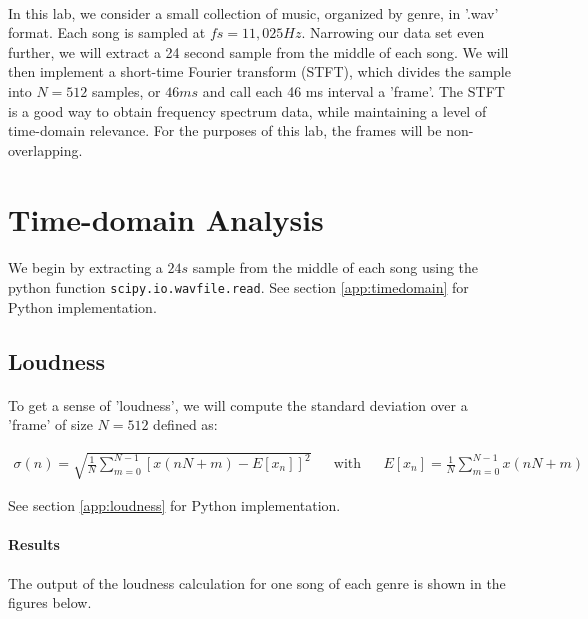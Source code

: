 \documentclass[11pt,a4paper]{article}
\begin{document}
\paragraph*{} In this lab, we consider a small collection of music, organized by genre, in '.wav' format. Each song is sampled at $fs=11,025Hz$. Narrowing our data set even further, we will extract a 24 second sample from the middle of each song. We will then implement a short-time Fourier transform (STFT), which divides the sample into $N=512$ samples, or $46ms$ and call each 46 ms interval a 'frame'. The STFT is a good way to obtain frequency spectrum data, while maintaining a level of time-domain relevance. For the purposes of this lab, the frames will be non-overlapping.

\section{Time-domain Analysis}
\paragraph*{} We begin by extracting a $24s$ sample from the middle of each song using the python function \verb|scipy.io.wavfile.read|. See section \ref{app:timedomain} for Python implementation.
\subsection{Loudness}
\paragraph{} To get a sense of 'loudness', we will compute the standard deviation over a 'frame' of size $N=512$ defined as:

\begin{align}
\sigma(n)=\sqrt{\frac{1}{N}\sum_{m=0}^{N-1} [x(nN+m)-E[x_n]]^2} && \text{with} && E[x_n]=\frac{1}{N}\sum_{m=0}^{N-1} x(nN+m)
\end{align}

See section \ref{app:loudness} for Python implementation.

\paragraph{Results} The output of the loudness calculation for one song of each genre is shown in the figures below. 
\end{document}
